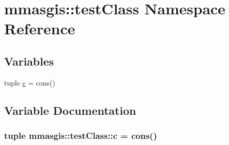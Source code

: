 \hypertarget{namespacemmasgis_1_1testClass}{
\section{mmasgis::testClass Namespace Reference}
\label{namespacemmasgis_1_1testClass}
}
\subsection*{Variables}
\begin{DoxyCompactItemize}
\item 
tuple \hyperlink{namespacemmasgis_1_1testClass_a44b9fbfb79fd18fcc4ebff1a1e2014a1}{c} = cons()
\end{DoxyCompactItemize}


\subsection{Variable Documentation}
\hypertarget{namespacemmasgis_1_1testClass_a44b9fbfb79fd18fcc4ebff1a1e2014a1}{
\subsubsection[{c}]{\setlength{\rightskip}{0pt plus 5cm}tuple {\bf mmasgis::testClass::c} = cons()}}
\label{namespacemmasgis_1_1testClass_a44b9fbfb79fd18fcc4ebff1a1e2014a1}
